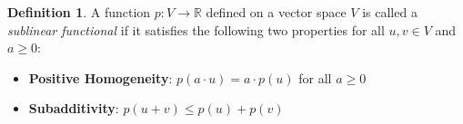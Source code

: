 \documentclass[12pt, reqno]{amsart}
\theoremstyle{definition}
\newtheorem{definition}[theorem]{Definition}
\newtheorem{example}[theorem]{Example}
\numberwithin{equation}{section}
\newcommand{\dR}{{\mathbb R}}
\begin{document}
\begin{definition}
    A function $p: V \to \dR$ defined on a vector space $V$ is called a \textit{sublinear functional} if it satisfies the following two properties for all $u, v \in V$ and $a \geq 0$:

\begin{itemize}
    \item \textbf{Positive Homogeneity}: $p(a \cdot u) = a \cdot p(u)$ for all $a \geq 0$
    \item \textbf{Subadditivity}: $p(u + v) \leq p(u) + p(v)$
\end{itemize}
\end{definition}
\begin{comment}
    \begin{example}
    Consider the vector space $V = \mathbb{R}^n$ and define the function $p: \mathbb{R}^n \to \mathbb{R}$ by:

\[
p(x) = \|x\|_2 = \sqrt{x_1^2 + x_2^2 + \cdots + x_n^2}
\]

This function $p(x)$, which represents the Euclidean norm of the vector $x$, is a sublinear functional because it satisfies the following properties:

\begin{itemize}
    \item \textbf{Positive Homogeneity}: For any $a \geq 0$ and any vector $x \in \mathbb{R}^n$, we have:
    \[
    p(a \cdot x) = \|a \cdot x\|_2 = a \cdot \|x\|_2
    \]
    
    \item \textbf{Subadditivity}: For any vectors $x, y \in \mathbb{R}^n$, we have:
    \[
    p(x + y) = \|x + y\|_2 \leq \|x\|_2 + \|y\|_2
    \]
    by the triangle inequality.
\end{itemize}
    \end{example}
\end{comment}
\end{document}

